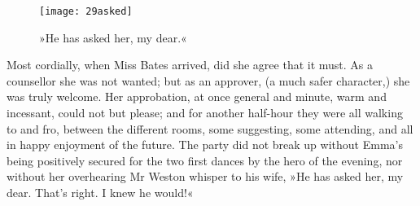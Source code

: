 \begin{figure}[tbph]
\centering
\texttt{[image: 29asked]}
\caption{»He has asked her, my dear.«}
\end{figure}

Most cordially, when Miss Bates arrived, did she agree that it must. As a counsellor she was not wanted; but as an approver, (a much safer character,) she was truly welcome. Her approbation, at once general and minute, warm and incessant, could not but please; and for another half-hour they were all walking to and fro, between the different rooms, some suggesting, some attending, and all in happy enjoyment of the future. The party did not break up without Emma's being positively secured for the two first dances by the hero of the evening, nor without her overhearing Mr Weston whisper to his wife, »He has asked her, my dear. That's right. I knew he would!«